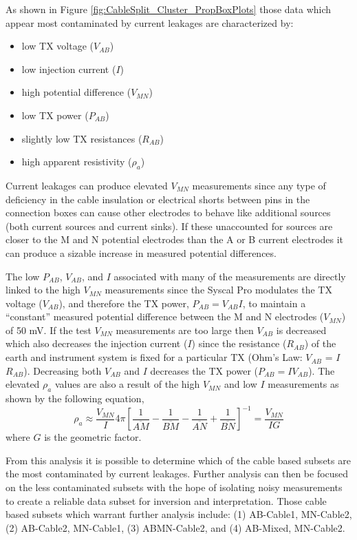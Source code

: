 \documentclass[final,authoryear,5p,times,twocolumn]{elsarticle}
\begin{document}
As shown in Figure \ref{fig:CableSplit_Cluster_PropBoxPlots} those data which appear most contaminated by current leakages are characterized by:
\begin{itemize}
	\item{low TX voltage ($V_{AB}$)}
	\item{low injection current ($I$)}
	\item{high potential difference ($V_{MN}$)}
	\item{low TX power ($P_{AB}$)}
	\item{slightly low TX resistances ($R_{AB}$)}
	\item{high apparent resistivity ($\rho_{a}$)}
\end{itemize}
Current leakages can produce elevated $V_{MN}$ measurements since any type of deficiency in the cable insulation or electrical shorts between pins in the connection boxes can cause other electrodes to behave like additional sources (both current sources and current sinks). If these unaccounted for sources are closer to the M and N potential electrodes than the A or B current electrodes it can produce a sizable increase in measured potential differences.

The low $P_{AB}$, $V_{AB}$, and $I$ associated with many of the measurements are directly linked to the high $V_{MN}$ measurements since the Syscal Pro modulates the TX voltage ($V_{AB}$), and therefore the TX power, $P_{AB} = V_{AB} I$, to maintain a ``constant'' measured potential difference between the M and N electrodes ($V_{MN}$) of 50 mV. If the test $V_{MN}$ measurements are too large then $V_{AB}$ is decreased which also decreases the injection current ($I$) since the resistance ($R_{AB}$) of the earth and instrument system is fixed for a particular TX (Ohm's Law: $V_{AB}$ = $I$ $R_{AB}$). Decreasing both $V_{AB}$ and $I$ decreases the TX power ($P_{AB} = I V_{AB}$). The elevated $\rho_{a}$ values are also a result of the high $V_{MN}$ and low $I$ measurements as shown by the following equation,
\begin{equation}
 \rho_{a} \approx \frac{V_{MN}}{I} 4 \pi \left[ \frac{1}{\overline{AM}} - \frac{1}{\overline{BM}} - \frac{1}{\overline{AN}} + \frac{1}{\overline{BN}} \right]^{-1} = \frac{V_{MN}}{IG}
\end{equation}
where $G$ is the geometric factor.

From this analysis it is possible to determine which of the cable based subsets are the most contaminated by current leakages. Further analysis can then be focused on the less contaminated subsets with the hope of isolating noisy measurements to create a reliable data subset for inversion and interpretation. Those cable based subsets which warrant further analysis include: (1) AB-Cable1, MN-Cable2, (2) AB-Cable2, MN-Cable1, (3) ABMN-Cable2, and (4) AB-Mixed, MN-Cable2.
\end{document}
